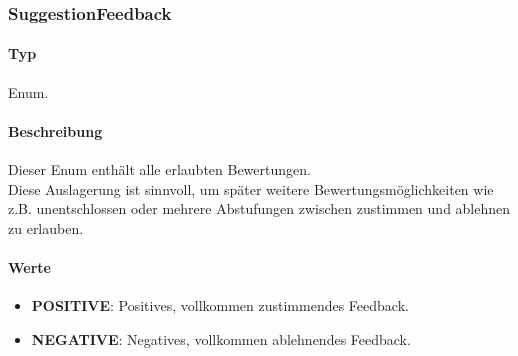 \subsubsection{SuggestionFeedback}\label{App_AddAlias_SuggestionFeedback}
\paragraph*{Typ}
Enum.
\paragraph*{Beschreibung}
Dieser Enum enthält alle erlaubten Bewertungen.\\
Diese Auslagerung ist sinnvoll, um später weitere Bewertungsmöglichkeiten wie z.B. unentschlossen oder 
mehrere Abstufungen zwischen zustimmen und ablehnen zu erlauben.

\paragraph*{Werte}
\begin{itemize}
    \item \textbf{POSITIVE}: Positives, vollkommen zustimmendes Feedback.
    \item \textbf{NEGATIVE}: Negatives, vollkommen ablehnendes Feedback.
\end{itemize}
